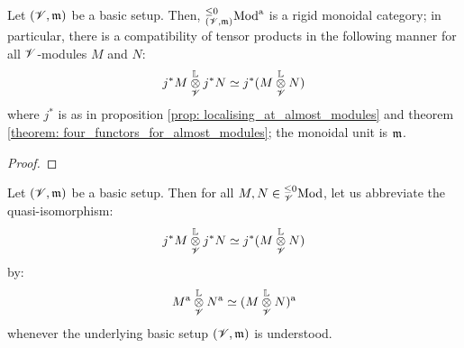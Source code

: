                     \begin{proposition} \label{prop: tensor_products_of_almost_modules}
                        Let $(\mathscr{V}, \mathfrak{m})$ be a basic setup. Then, ${}_{(\mathscr{V}, \mathfrak{m})}^{\leq 0}\mathrm{Mod}^{\mathrm{a}}$ is a rigid monoidal category; in particular, there is a compatibility of tensor products in the following manner for all $\mathscr{V}$-modules $M$ and $N$:
                            $$j^*M \tensor^{\L}_{\scrV} j^*N \cong j^*(M \tensor^{\L}_{\scrV} N)$$
                        where $j^*$ is as in proposition \ref{prop: localising_at_almost_modules} and theorem \ref{theorem: four_functors_for_almost_modules}; the monoidal unit is $\mathfrak{m}$.
                    \end{proposition}
                        \begin{proof}
                            
                        \end{proof}
                    \begin{convention} \label{conv: almost_tensor_products}
                        Let $(\mathscr{V}, \mathfrak{m})$ be a basic setup. Then for all $M, N \in {}_{\mathscr{V}}^{\leq 0}\mathrm{Mod}$, let us abbreviate the quasi-isomorphism:
                            $$j^*M \tensor^{\L}_{\scrV} j^*N \cong j^*(M \tensor^{\L}_{\scrV} N)$$
                        by:
                            $$M^{\almost} \tensor^{\L}_{\scrV} N^{\almost} \cong (M \tensor^{\L}_{\scrV} N)^{\almost}$$
                        whenever the underlying basic setup $(\mathscr{V}, \mathfrak{m})$ is understood.
                    \end{convention}
